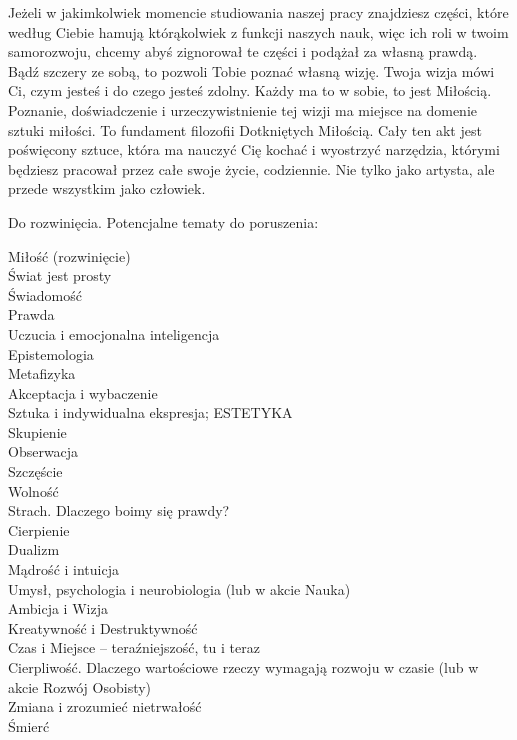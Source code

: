 Jeżeli w jakimkolwiek momencie studiowania naszej pracy znajdziesz części, 
które według Ciebie hamują którąkolwiek z funkcji naszych nauk,
więc ich roli w twoim samorozwoju,
chcemy abyś zignorował te części i podążał za własną prawdą.
Bądź szczery ze sobą, to pozwoli Tobie poznać własną wizję.
Twoja wizja mówi Ci, czym jesteś i do czego jesteś zdolny.
Każdy ma to w sobie, to jest Miłością.
Poznanie, doświadczenie i urzeczywistnienie tej wizji ma miejsce na domenie sztuki miłości.
To fundament filozofii Dotkniętych Miłością.
Cały ten akt jest poświęcony sztuce, która ma nauczyć Cię kochać i wyostrzyć narzędzia, 
którymi będziesz pracował przez całe swoje życie, codziennie.
Nie tylko jako artysta, ale przede wszystkim jako człowiek.

\ornamentbreak

Do rozwinięcia.
\vin Potencjalne tematy do poruszenia:

Miłość (rozwinięcie) \\
Świat jest prosty \\
Świadomość \\
Prawda \\
Uczucia i emocjonalna inteligencja \\
Epistemologia \\
Metafizyka \\
Akceptacja i wybaczenie \\
Sztuka i indywidualna ekspresja; ESTETYKA \\
Skupienie \\
Obserwacja \\
Szczęście \\
Wolność \\
Strach. Dlaczego boimy się prawdy? \\
Cierpienie \\
Dualizm \\
Mądrość i intuicja \\
Umysł, psychologia i neurobiologia (lub w akcie Nauka) \\
Ambicja i Wizja \\
Kreatywność i Destruktywność \\
Czas i Miejsce -- teraźniejszość, tu i teraz \\
Cierpliwość. Dlaczego wartościowe rzeczy wymagają rozwoju w czasie (lub w akcie Rozwój Osobisty) \\
Zmiana i zrozumieć nietrwałość \\
Śmierć

